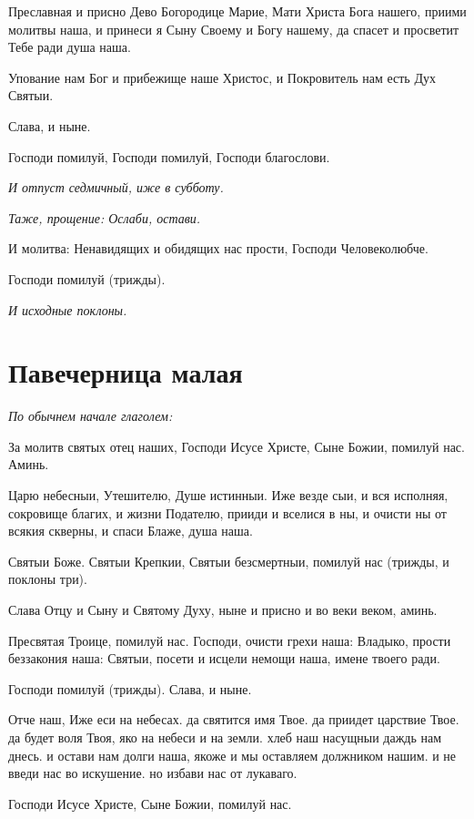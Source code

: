 Преславная и присно Дево Богородице Марие, Мати Христа Бога нашего, приими молитвы наша, и принеси я Сыну Своему и Богу нашему, да спасет и просветит Тебе ради душа наша.

Упование нам Бог и прибежище наше Христос, и Покровитель нам есть Дух Святыи.

Слава, и ныне. 

Господи помилуй, Господи помилуй, Господи благослови.


\itshape И отпуст седмичный, иже в субботу.\normalfont{}


\itshape Таже, прощение: Ослаби, остави. 

И молитва:\normalfont{} Ненавидящих и обидящих нас прости, Господи Человеколюбче.

Господи помилуй (трижды). 

\itshape И исходные поклоны.\normalfont{}


\section{Павечерница малая}
 


\itshape По обычнем начале глаголем:\normalfont{}


За молитв святых отец наших, Господи Исусе Христе, Сыне Божии, помилуй нас. Аминь.

Царю небесныи, Утешителю, Душе истинныи. Иже везде сыи, и вся исполняя, сокровище благих, и жизни Подателю, прииди и вселися в ны, и очисти ны от всякия скверны, и спаси Блаже, душа наша.

Святыи Боже. Святыи Крепкии, Святыи безсмертныи, помилуй нас (трижды, и поклоны три).

Слава Отцу и Сыну и Святому Духу, ныне и присно и во веки веком, аминь.

Пресвятая Троице, помилуй нас. Господи, очисти грехи наша: Владыко, прости беззакония наша: Святыи, посети и исцели немощи наша, имене твоего ради. 

Господи помилуй (трижды). Слава, и ныне.

Отче наш, Иже еси на небесах. да святится имя Твое. да приидет царствие Твое. да будет воля Твоя, яко на небеси и на земли. хлеб наш насущныи даждь нам днесь. и остави нам долги наша, якоже и мы оставляем должником нашим. и не введи нас во искушение. но избави нас от лукаваго.

Господи Исусе Христе, Сыне Божии, помилуй нас.

